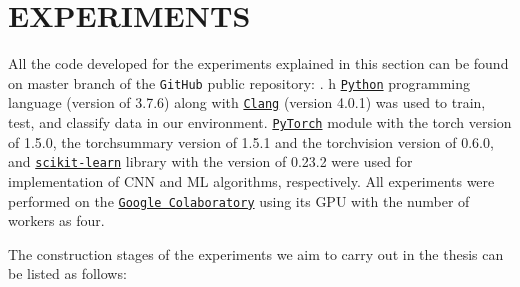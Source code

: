 \chapter{EXPERIMENTS}
\label{ch:CH5}

All the code developed for the experiments explained in this section can be found on master branch of the \verb|GitHub| public repository: \newline
\textcolor{blue}{}.
h
\href{https://www.python.org/downloads/release/python-376/}{\texttt{Python}} programming language (version of 3.7.6) along with \href{https://releases.llvm.org/4.0.1/}{\texttt{Clang}} (version 4.0.1) was used to train, test, and classify data in our environment. \href{https://pytorch.org/get-started/previous-versions/#v150}{\texttt{PyTorch}} module with the torch version of 1.5.0, the torchsummary version of 1.5.1 and the torchvision version of 0.6.0, and \href{https://scikit-learn.org/stable/whats_new/v0.23.html}{\texttt{scikit-learn}} library with the version of 0.23.2 were used for implementation of CNN and ML algorithms, respectively. All experiments were performed on the \href{https://colab.research.google.com/}{\texttt{Google Colaboratory}} using its GPU with the number of workers as four.

The construction stages of the experiments we aim to carry out in the thesis can be listed as follows:

